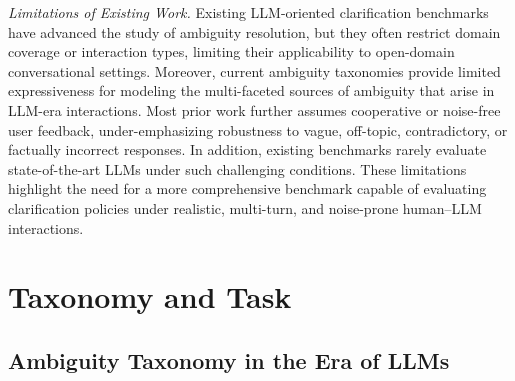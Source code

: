 \documentclass[sigconf]{acmart}
\begin{document}
\textit{Limitations of Existing Work.}
Existing LLM-oriented clarification benchmarks have advanced the study of ambiguity resolution, but they often restrict domain coverage or interaction types, limiting their applicability to open-domain conversational settings.
Moreover, current ambiguity taxonomies provide limited expressiveness for modeling the multi-faceted sources of ambiguity that arise in LLM-era interactions.
Most prior work further assumes cooperative or noise-free user feedback, under-emphasizing robustness to vague, off-topic, contradictory, or factually incorrect responses.
In addition, existing benchmarks rarely evaluate state-of-the-art LLMs under such challenging conditions.
These limitations highlight the need for a more comprehensive benchmark capable of evaluating clarification policies under realistic, multi-turn, and noise-prone human–LLM interactions.














\section{Taxonomy and Task}

\subsection{Ambiguity Taxonomy in the Era of LLMs}
\label{sec:clarification-types}
\end{document}
